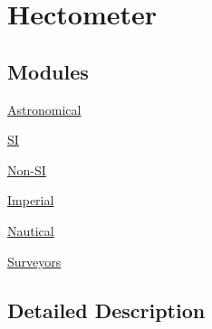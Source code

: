 \hypertarget{group___e_g_x_math-_conversions-_length_conversions-_hectometer}{}\section{Hectometer}
\label{group___e_g_x_math-_conversions-_length_conversions-_hectometer}
\subsection*{Modules}
\begin{DoxyCompactItemize}
\item 
\mbox{\hyperlink{group___e_g_x_math-_conversions-_length_conversions-_hectometer-_astronomical}{Astronomical}}
\item 
\mbox{\hyperlink{group___e_g_x_math-_conversions-_length_conversions-_hectometer-_s_i}{SI}}
\item 
\mbox{\hyperlink{group___e_g_x_math-_conversions-_length_conversions-_hectometer-_non-_s_i}{Non-\/\+SI}}
\item 
\mbox{\hyperlink{group___e_g_x_math-_conversions-_length_conversions-_hectometer-_imperial}{Imperial}}
\item 
\mbox{\hyperlink{group___e_g_x_math-_conversions-_length_conversions-_hectometer-_nautical}{Nautical}}
\item 
\mbox{\hyperlink{group___e_g_x_math-_conversions-_length_conversions-_hectometer-_surveyors}{Surveyors}}
\end{DoxyCompactItemize}


\subsection{Detailed Description}
